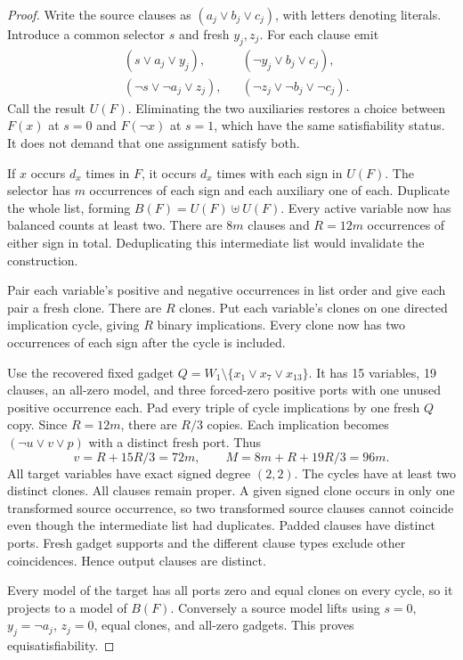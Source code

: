 \documentclass[11pt]{article}
\begin{document}
\begin{proof}
Write the source clauses as $(a_j\lor b_j\lor c_j)$, with letters denoting literals. Introduce a common selector $s$ and fresh $y_j,z_j$. For each clause emit
\begin{align*}
 &(s\lor a_j\lor y_j),&& (\neg y_j\lor b_j\lor c_j),\\
 &(\neg s\lor\neg a_j\lor z_j),&& (\neg z_j\lor\neg b_j\lor\neg c_j).
\end{align*}
Call the result $U(F)$. Eliminating the two auxiliaries restores a choice between $F(x)$ at $s=0$ and $F(\neg x)$ at $s=1$, which have the same satisfiability status. It does not demand that one assignment satisfy both.

If $x$ occurs $d_x$ times in $F$, it occurs $d_x$ times with each sign in $U(F)$. The selector has $m$ occurrences of each sign and each auxiliary one of each. Duplicate the whole list, forming $B(F)=U(F)\uplus U(F)$. Every active variable now has balanced counts at least two. There are $8m$ clauses and $R=12m$ occurrences of either sign in total. Deduplicating this intermediate list would invalidate the construction.

Pair each variable's positive and negative occurrences in list order and give each pair a fresh clone. There are $R$ clones. Put each variable's clones on one directed implication cycle, giving $R$ binary implications. Every clone now has two occurrences of each sign after the cycle is included.

Use the recovered fixed gadget $Q=W_1\setminus\{x_1\lor x_7\lor x_{13}\}$. It has 15 variables, 19 clauses, an all-zero model, and three forced-zero positive ports with one unused positive occurrence each. Pad every triple of cycle implications by one fresh $Q$ copy. Since $R=12m$, there are $R/3$ copies. Each implication becomes $(\neg u\lor v\lor p)$ with a distinct fresh port. Thus
\[
 v=R+15R/3=72m,\qquad M=8m+R+19R/3=96m.
\]
All target variables have exact signed degree $(2,2)$. The cycles have at least two distinct clones. All clauses remain proper. A given signed clone occurs in only one transformed source occurrence, so two transformed source clauses cannot coincide even though the intermediate list had duplicates. Padded clauses have distinct ports. Fresh gadget supports and the different clause types exclude other coincidences. Hence output clauses are distinct.

Every model of the target has all ports zero and equal clones on every cycle, so it projects to a model of $B(F)$. Conversely a source model lifts using $s=0$, $y_j=\neg a_j$, $z_j=0$, equal clones, and all-zero gadgets. This proves equisatisfiability.


\end{proof}
\end{document}
